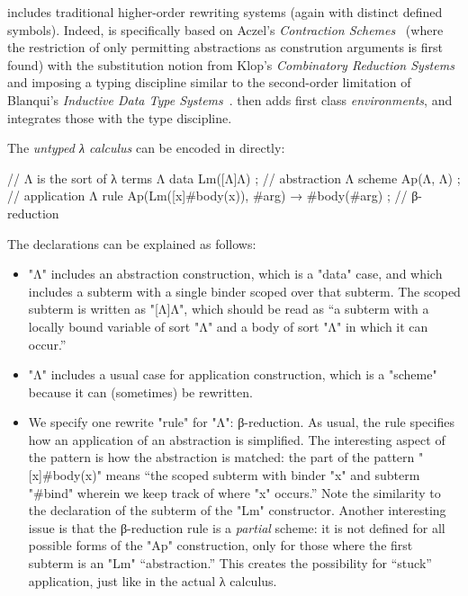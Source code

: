 \documentclass[letterpaper,11pt]{article}
\begin{document}
\hax includes traditional higher-order rewriting systems (again with distinct defined symbols).
Indeed, \hax is specifically based on Aczel's \emph{Contraction Schemes}~\cite{Aczel:1978} (where
the restriction of only permitting abstractions as constrution arguments is first found) with the
substitution notion from Klop's \emph{Combinatory Reduction Systems}~\cite{Klop+:tcs1993} and
imposing a typing discipline similar to the second-order limitation of Blanqui's \emph{Inductive
  Data Type Systems}~\cite{BlanquiJouannaudOkada:tcs2002}. \hax then adds first class
\emph{environments}, and integrates those with the type discipline.

\begin{example}\label{ex:lambda}
  The \emph{untyped λ calculus} can be encoded in \hax directly:
  \begin{hacs}[numbers=right,texcl]
    // Λ is the sort of λ terms
    Λ  data Lm([Λ]Λ) ;                                        // abstraction
    Λ  scheme Ap(Λ, Λ) ;                                      // application
    Λ  rule Ap(Lm([x]#body(x)), #arg) →  #body(#arg) ;    // β-reduction
  \end{hacs}
  The declarations can be explained as follows:
  \begin{itemize}

  \item "Λ" includes an abstraction construction, which is a "data" case, and which includes a
    subterm with a single binder scoped over that subterm. The scoped subterm is written as
    "[Λ]Λ", which should be read as ``a subterm with a locally bound variable of sort "Λ" and a
    body of sort "Λ" in which it can occur.''

  \item "Λ" includes a usual case for application construction, which is a "scheme" because it
    can (sometimes) be rewritten.

  \item We specify one rewrite "rule" for "Λ": β-reduction. As usual, the rule specifies how an
    application of an abstraction is simplified. The interesting aspect of the pattern is how the
    abstraction is matched: the part of the pattern "[x]#body(x)" means ``the scoped subterm with
    binder "x" and subterm "#bind" wherein we keep track of where "x" occurs.'' Note the similarity
    to the declaration of the subterm of the "Lm" constructor. Another interesting issue is that the
    β-reduction rule is a \emph{partial} scheme: it is not defined for all possible forms of the
    "Ap" construction, only for those where the first subterm is an "Lm" ``abstraction.'' This
    creates the possibility for ``stuck'' application, just like in the actual λ calculus.


\end{itemize}
\end{example}
\end{document}
